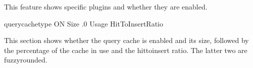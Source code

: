 \documentclass[letterpaper,10pt,english]{sphinxmanual}
\begin{document}
\sphinxAtStartPar
This feature shows specific plugins and whether they are enabled.

\begin{sphinxVerbatim}[commandchars=\\\{\}]
         query\PYGZus{}cache\PYGZus{}type  ON
                     Size  .0
                    Usage  \PYGZpc{}
         HitToInsertRatio  \PYGZpc{}
\end{sphinxVerbatim}

\sphinxAtStartPar
This section shows whether the query cache is enabled and its size, followed by
the percentage of the cache in use and the hit\sphinxhyphen{}to\sphinxhyphen{}insert ratio. The latter two
are fuzzy\sphinxhyphen{}rounded.
\end{document}
